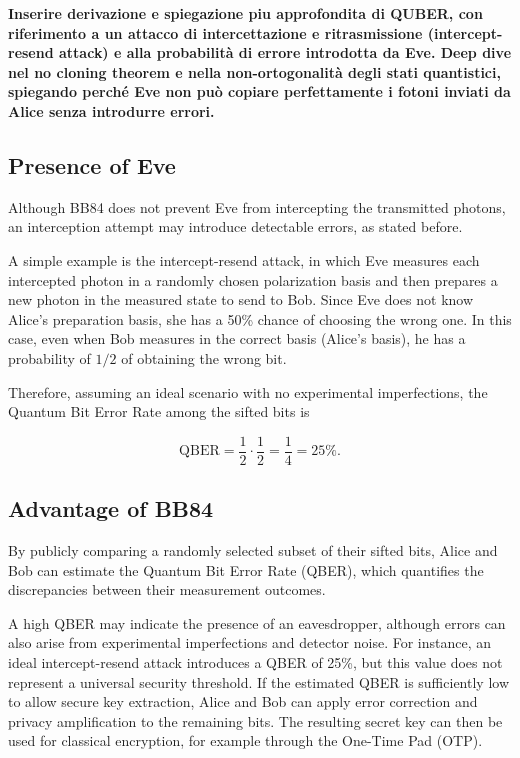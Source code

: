 \documentclass[10pt,letterpaper]{report}
\begin{document}
\large\textbf{Inserire derivazione e spiegazione piu approfondita di QUBER, con riferimento a un attacco di intercettazione e ritrasmissione (intercept-resend attack) e alla probabilità di errore introdotta da Eve.
Deep dive nel no cloning theorem e nella non-ortogonalità degli stati quantistici, spiegando perché Eve non può copiare perfettamente i fotoni inviati da Alice senza introdurre errori.}


\subsection{Presence of Eve}

Although BB84 does not prevent Eve from intercepting the transmitted photons, an interception attempt may introduce detectable errors, as stated before.

A simple example is the intercept-resend attack, in which Eve measures each intercepted photon in a randomly chosen polarization basis and then prepares a new photon in the measured state to send to Bob.
Since Eve does not know Alice's preparation basis, she has a 50\% chance of choosing the wrong one. 
In this case, even when Bob measures in the correct basis (Alice's basis), he has a probability of $1/2$ of obtaining the wrong bit.

Therefore, assuming an ideal scenario with no experimental imperfections, the Quantum Bit Error Rate among the sifted bits is

\[
    \mathrm{QBER} 
    = \frac{1}{2} \cdot \frac{1}{2}
    = \frac{1}{4} = 25\%.
\]


\subsection{Advantage of BB84}

By publicly comparing a randomly selected subset of their sifted bits, Alice and Bob can estimate the Quantum Bit Error Rate (QBER), which quantifies the discrepancies
between their measurement outcomes.

A high QBER may indicate the presence of an eavesdropper, although errors can also arise from experimental imperfections and detector noise. For instance, an ideal intercept-resend attack introduces a QBER of 25\%, but
this value does not represent a universal security threshold.
If the estimated QBER is sufficiently low to allow secure key extraction, Alice and Bob can apply error correction and privacy amplification to the remaining bits.
The resulting secret key can then be used for classical encryption, for example through the One-Time Pad (OTP).
\end{document}

